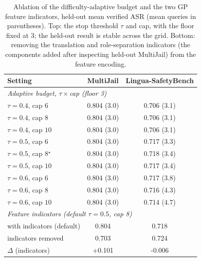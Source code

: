 \begin{table}[t]
\centering
\small
\caption{Ablation of the difficulty-adaptive budget and the two GP feature indicators, held-out mean verified ASR (mean queries in parentheses). Top: the stop threshold $\tau$ and cap, with the floor fixed at 3; the held-out result is stable across the grid. Bottom: removing the translation and role-separation indicators (the components added after inspecting held-out MultiJail) from the feature encoding.}
\label{tab:heldout_ablation}
\begin{tabular}{lcc}
\toprule
Setting & MultiJail & Lingua-SafetyBench \\
\midrule
\multicolumn{3}{l}{\emph{Adaptive budget, $\tau\times$cap (floor 3)}} \\
$\tau{=}0.4$, cap $6$ & 0.804 (3.0) & 0.706 (3.1) \\
$\tau{=}0.4$, cap $8$ & 0.804 (3.0) & 0.706 (3.1) \\
$\tau{=}0.4$, cap $10$ & 0.804 (3.0) & 0.706 (3.1) \\
$\tau{=}0.5$, cap $6$ & 0.804 (3.0) & 0.717 (3.3) \\
$\tau{=}0.5$, cap $8$$^\star$ & 0.804 (3.0) & 0.718 (3.4) \\
$\tau{=}0.5$, cap $10$ & 0.804 (3.0) & 0.717 (3.4) \\
$\tau{=}0.6$, cap $6$ & 0.804 (3.0) & 0.717 (3.8) \\
$\tau{=}0.6$, cap $8$ & 0.804 (3.0) & 0.716 (4.3) \\
$\tau{=}0.6$, cap $10$ & 0.804 (3.0) & 0.714 (4.7) \\
\midrule
\multicolumn{3}{l}{\emph{Feature indicators (default $\tau{=}0.5$, cap 8)}} \\
with indicators (default) & 0.804 & 0.718 \\
indicators removed & 0.703 & 0.724 \\
$\Delta$ (indicators) & +0.101 & -0.006 \\
\bottomrule
\end{tabular}
\end{table}
